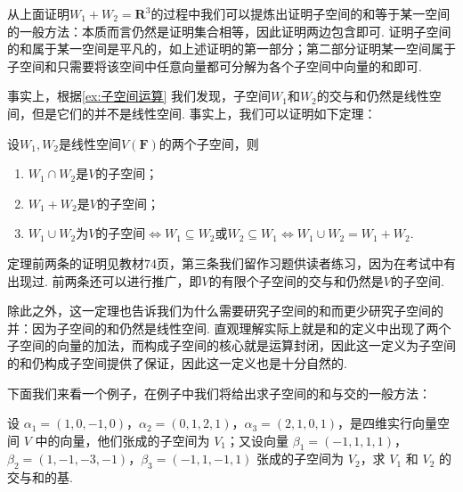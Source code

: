 从上面证明$W_1+W_2=\mathbf{R}^3$的过程中我们可以提炼出证明子空间的和等于某一空间的一般方法：本质而言仍然是证明集合相等，因此证明两边包含即可. 证明子空间的和属于某一空间是平凡的，如上述证明的第一部分；第二部分证明某一空间属于子空间和只需要将该空间中任意向量都可分解为各个子空间中向量的和即可.

事实上，根据\autoref{ex:子空间运算} 我们发现，子空间$W_1$和$W_2$的交与和仍然是线性空间，但是它们的并不是线性空间. 事实上，我们可以证明如下定理：
\begin{theorem}{}{}
    设$W_1,W_2$是线性空间$V(\mathbf{F})$的两个子空间，则
    \begin{enumerate}
        \item $W_1 \cap W_2$是$V$的子空间；

        \item $W_1 + W_2$是$V$的子空间；

        \item $W_1 \cup W_2$为$V$的子空间$\iff W_1 \subseteq W_2$或$W_2 \subseteq W_1 \iff W_1 \cup W_2=W_1+W_2$.
    \end{enumerate}
\end{theorem}

定理前两条的证明见教材74页，第三条我们留作习题供读者练习，因为在考试中有出现过. 前两条还可以进行推广，即$V$的有限个子空间的交与和仍然是$V$的子空间.

除此之外，这一定理也告诉我们为什么需要研究子空间的和而更少研究子空间的并：因为子空间的和仍然是线性空间. 直观理解实际上就是和的定义中出现了两个子空间的向量的加法，而构成子空间的核心就是运算封闭，因此这一定义为子空间的和仍构成子空间提供了保证，因此这一定义也是十分自然的.

下面我们来看一个例子，在例子中我们将给出求子空间的和与交的一般方法：
\begin{example}{}{}
    设 $\alpha_1 = (1, 0, -1, 0)$，$\alpha_2 = (0, 1, 2, 1)$，$\alpha_3 = (2, 1, 0, 1)$，是四维实行向量空间 $V$ 中的向量，他们张成的子空间为 $V_1$；又设向量 $\beta_1 = (-1, 1, 1, 1)$，$\beta_2 = (1, -1, -3, -1)$，$\beta_3 = (-1, 1, -1, 1)$ 张成的子空间为 $V_2$，求 $V_1$ 和 $V_2$ 的交与和的基.
\end{example}

